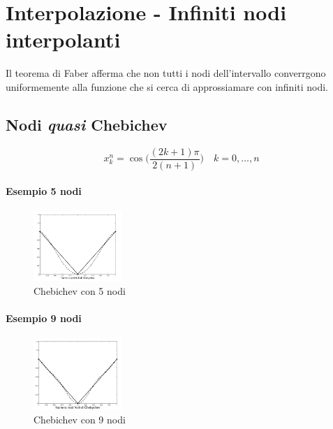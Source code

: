 
\chapter{Interpolazione - Infiniti nodi interpolanti}

Il teorema di Faber afferma che non tutti i nodi dell'intervallo converrgono uniformemente
alla funzione che si cerca di approssiamare con infiniti nodi.

\section{Nodi \textit{quasi} Chebichev}
\begin{equation}
x_k^n = \cos \Bigg(\displaystyle\frac{(2k + 1) \pi}{2(n + 1)}\Bigg) \quad k = 0, \dots, n
\end{equation}



\subsubsection{Esempio 5 nodi}
\begin{figure}[h!]
  \begin{center}
    \includegraphics[width=0.3\textwidth]{./images/5_nodi_chebichev.png}
  \end{center}
  \caption{Chebichev con 5 nodi}
  \label{fig:chebichev_5_nodi}
\end{figure}

\subsubsection{Esempio 9 nodi}
\begin{figure}[h!]
  \begin{center}
    \includegraphics[width=0.3\textwidth]{./images/9_nodi_chebichev.png}
  \end{center}
  \caption{Chebichev con 9 nodi}
  \label{fig:chebichev_9_nodi}
\end{figure}

